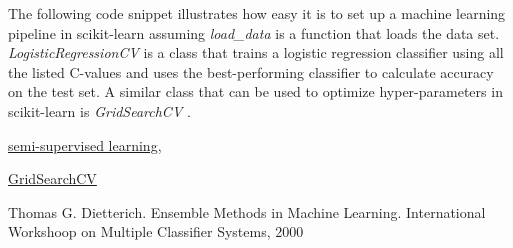 \documentclass[fleqn,10pt]{SelfArx} %
\begin{document}
The following code snippet illustrates how easy it is to set up a machine
learning pipeline in scikit-learn assuming \textit{load\_data} is a function that
loads the data set. \textit{LogisticRegressionCV} is a class that trains a
logistic regression classifier using all the listed C-values and uses the
best-performing classifier to calculate accuracy on the test set. A similar
class that can be used to optimize hyper-parameters in scikit-learn is
\textit{GridSearchCV} \cite{gridsearchcv}.




\begin{thebibliography}{2}

  \href{http://scikit-learn.org/stable/modules/generated/sklearn.semi\_supervised.LabelSpreading.html}{semi-supervised learning,}

  \href{http://scikit-learn.org/stable/modules/generated/sklearn.model\_selection.GridSearchCV.html}{GridSearchCV}

  Thomas G. Dietterich.
  Ensemble Methods in Machine Learning.
  International Workshoop on Multiple Classifier Systems, 2000

\end{thebibliography}

\end{document}

